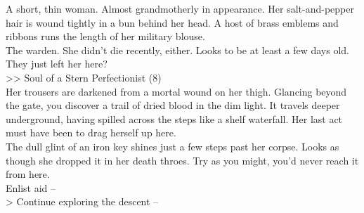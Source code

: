 A short, thin woman. Almost grandmotherly in appearance. Her salt-and-pepper hair is wound tightly in a bun behind her head. A host of brass emblems and ribbons runs the length of her military blouse.\\

The warden. She didn’t die recently, either. Looks to be at least a few days old. They just left her here?\\
>> Soul of a Stern Perfectionist (8)\\

Her trousers are darkened from a mortal wound on her thigh. Glancing beyond the gate, you discover a trail of dried blood in the dim light. It travels deeper underground, having spilled across the steps like a shelf waterfall. Her last act must have been to drag herself up here.\\

The dull glint of an iron key shines just a few steps past her corpse. Looks as though she dropped it in her death throes. Try as you might, you’d never reach it from here.\\

 Enlist aid -- \\
> Continue exploring the descent -- 